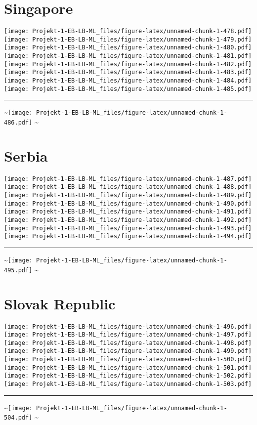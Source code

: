 \documentclass[]{article}
\begin{document}
\section{Singapore}\label{singapore}

\texttt{[image: Projekt-1-EB-LB-ML\_files/figure-latex/unnamed-chunk-1-478.pdf]}
\texttt{[image: Projekt-1-EB-LB-ML\_files/figure-latex/unnamed-chunk-1-479.pdf]}
\texttt{[image: Projekt-1-EB-LB-ML\_files/figure-latex/unnamed-chunk-1-480.pdf]}
\texttt{[image: Projekt-1-EB-LB-ML\_files/figure-latex/unnamed-chunk-1-481.pdf]}
\texttt{[image: Projekt-1-EB-LB-ML\_files/figure-latex/unnamed-chunk-1-482.pdf]}
\texttt{[image: Projekt-1-EB-LB-ML\_files/figure-latex/unnamed-chunk-1-483.pdf]}
\texttt{[image: Projekt-1-EB-LB-ML\_files/figure-latex/unnamed-chunk-1-484.pdf]}
\texttt{[image: Projekt-1-EB-LB-ML\_files/figure-latex/unnamed-chunk-1-485.pdf]}
\bigskip\hrule\bigskip
\textasciitilde{}\hfill\texttt{[image: Projekt-1-EB-LB-ML\_files/figure-latex/unnamed-chunk-1-486.pdf]}
\hfill \textasciitilde{} \vfill\eject

\section{Serbia}\label{serbia}

\texttt{[image: Projekt-1-EB-LB-ML\_files/figure-latex/unnamed-chunk-1-487.pdf]}
\texttt{[image: Projekt-1-EB-LB-ML\_files/figure-latex/unnamed-chunk-1-488.pdf]}
\texttt{[image: Projekt-1-EB-LB-ML\_files/figure-latex/unnamed-chunk-1-489.pdf]}
\texttt{[image: Projekt-1-EB-LB-ML\_files/figure-latex/unnamed-chunk-1-490.pdf]}
\texttt{[image: Projekt-1-EB-LB-ML\_files/figure-latex/unnamed-chunk-1-491.pdf]}
\texttt{[image: Projekt-1-EB-LB-ML\_files/figure-latex/unnamed-chunk-1-492.pdf]}
\texttt{[image: Projekt-1-EB-LB-ML\_files/figure-latex/unnamed-chunk-1-493.pdf]}
\texttt{[image: Projekt-1-EB-LB-ML\_files/figure-latex/unnamed-chunk-1-494.pdf]}
\bigskip\hrule\bigskip
\textasciitilde{}\hfill\texttt{[image: Projekt-1-EB-LB-ML\_files/figure-latex/unnamed-chunk-1-495.pdf]}
\hfill \textasciitilde{} \vfill\eject

\section{Slovak Republic}\label{slovak-republic}

\texttt{[image: Projekt-1-EB-LB-ML\_files/figure-latex/unnamed-chunk-1-496.pdf]}
\texttt{[image: Projekt-1-EB-LB-ML\_files/figure-latex/unnamed-chunk-1-497.pdf]}
\texttt{[image: Projekt-1-EB-LB-ML\_files/figure-latex/unnamed-chunk-1-498.pdf]}
\texttt{[image: Projekt-1-EB-LB-ML\_files/figure-latex/unnamed-chunk-1-499.pdf]}
\texttt{[image: Projekt-1-EB-LB-ML\_files/figure-latex/unnamed-chunk-1-500.pdf]}
\texttt{[image: Projekt-1-EB-LB-ML\_files/figure-latex/unnamed-chunk-1-501.pdf]}
\texttt{[image: Projekt-1-EB-LB-ML\_files/figure-latex/unnamed-chunk-1-502.pdf]}
\texttt{[image: Projekt-1-EB-LB-ML\_files/figure-latex/unnamed-chunk-1-503.pdf]}
\bigskip\hrule\bigskip
\textasciitilde{}\hfill\texttt{[image: Projekt-1-EB-LB-ML\_files/figure-latex/unnamed-chunk-1-504.pdf]}
\hfill \textasciitilde{} \vfill\eject
\end{document}
